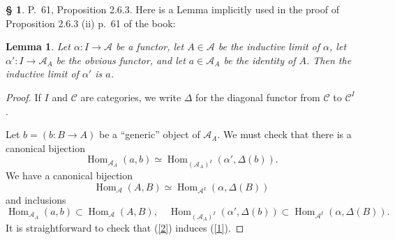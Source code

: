 \documentclass[12pt]{article}%
\newtheorem{lem}[thm]{Lemma}
\theoremstyle{remark}
\theoremstyle{definition}
\newtheorem{s}[thm]{\S}%
\newcommand{\A}{\mathcal A}
\newcommand{\C}{\mathcal C}
\DeclareMathOperator{\Hom}{Hom}%
\begin{document}
%

\begin{s} 
P.~61, Proposition 2.6.3. Here is a Lemma implicitly used in the proof of Proposition 2.6.3 (ii) p.~61 of the book: 

\begin{lem} 
Let $\alpha:I\to\A$ be a functor, let $A\in\A$ be the inductive limit of $\alpha$, let $\alpha':I\to\A_A$ be the obvious functor, and let $a\in\A_A$ be the identity of $A$. Then the inductive limit of $\alpha'$ is $a$. 
\end{lem} 

\begin{proof}
If $I$ and $\C$ are categories, we write $\Delta$ for the diagonal functor from $\C$ to $\C^I$. 

Let $b=(b:B\to A)$ be a ``generic'' object of $\A_A$. We must check that there is a canonical bijection
%
\begin{equation}\label{1}
\Hom_{\A_A}(a,b)\simeq\Hom_{(\A_A)^I}(\alpha',\Delta(b)).
\end{equation}
%
We have a canonical bijection
%
\begin{equation}\label{2}
\Hom_\A(A,B)\simeq\Hom_{\A^I}(\alpha,\Delta(B))
\end{equation}
%
and inclusions 
$$
\Hom_{\A_A}(a,b)\subset\Hom_\A(A,B),\quad
%
\Hom_{(\A_A)^I}(\alpha',\Delta(b))\subset\Hom_{\A^I}(\alpha,\Delta(B)).
$$
It is straightforward to check that (\ref{2}) induces (\ref{1}).
\end{proof}
\end{s}

%
\end{document}
